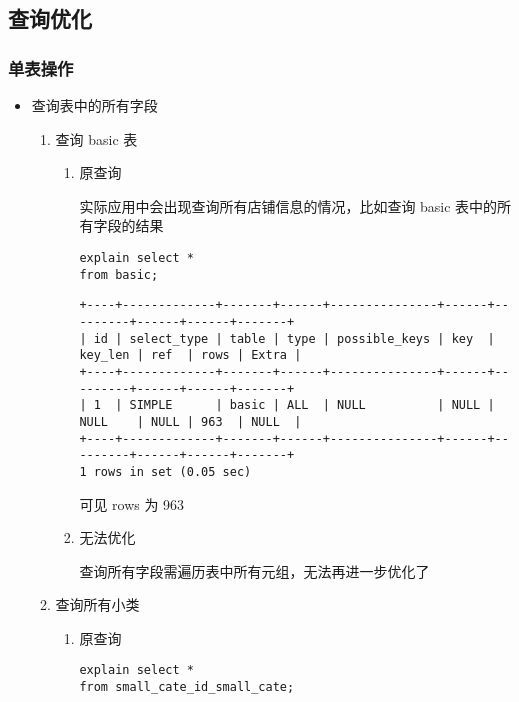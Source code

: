 \documentclass[11pt]{article}
\begin{document}
\subsection{查询优化}
\label{sec-3-2}
\subsubsection{单表操作}
\label{sec-3-2-1}
\begin{itemize}
\item 查询表中的所有字段
\label{sec-3-2-1-1}
\begin{enumerate}
\item 查询 basic 表
\begin{enumerate}
\item 原查询

实际应用中会出现查询所有店铺信息的情况，比如查询 basic
表中的所有字段的结果

\begin{lstlisting}
explain select *
from basic;
\end{lstlisting}

\begin{verbatim}
+----+-------------+-------+------+---------------+------+---------+------+------+-------+
| id | select_type | table | type | possible_keys | key  | key_len | ref  | rows | Extra |
+----+-------------+-------+------+---------------+------+---------+------+------+-------+
| 1  | SIMPLE      | basic | ALL  | NULL          | NULL | NULL    | NULL | 963  | NULL  |
+----+-------------+-------+------+---------------+------+---------+------+------+-------+
1 rows in set (0.05 sec)
\end{verbatim}

可见 rows 为 963

\item 无法优化

查询所有字段需遍历表中所有元组，无法再进一步优化了
\end{enumerate}

\item 查询所有小类
\begin{enumerate}
\item 原查询

\begin{lstlisting}
explain select *
from small_cate_id_small_cate;
\end{lstlisting}


\end{enumerate}
\end{enumerate}
\end{itemize}
\end{document}
